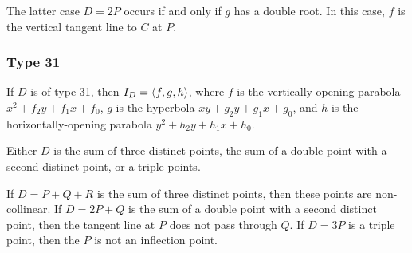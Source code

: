   The latter case $D = 2P$ occurs if and only if $g$ has a double root.
  In this case, $f$ is the vertical tangent line to $C$ at $P$.

\begin{comment}
\subsubsection{Type 21}
  If $D$ is of type 21, then $I_D = \pid{f, g}$, where $f$ is the non-vertical line $y + f_1x + f_0$
  and $g$ is the univariate polynomial $x^2 + g_1x + g_0$.
  Thus $D$ is the sum of two points on the line $f$, whose $x$-coordinates are the roots of $g$.
  
  There are two possibilities.
  If $g$ has two distinct roots, then $D = P + Q$ for two distinct points $P$ and $Q$.
  If $g$ has a double root, then $D = 2P$ and $f$ is the tangent line at $P$.
  
  So either $D$ is the sum of two distinct points with different $x$-coordinates,
  or $D$ is a double point $D = 2P$ and the tangent line at $P$ is non-vertical.
\end{comment}
\begin{comment}
\subsubsection{Type 22}
  If $D$ is of type 21, then $I_D = \pid{f, g}$, where $f$ is the vertical line $x + f_0$
  and $g$ is the univariate polynomial $y^2 + g_2y + g_0$.
  
  Either $D = P + Q$ is the sum of two distinct points with the same $x$-coordinate but different $y$-coordinates,
  or $D = 2P$ is a double point and the tangent line at $P$ is vertical.
\end{comment}

\subsubsection{Type 31}
  If $D$ is of type 31, then $I_D = \left\langle f, g, h \right\rangle$,
  where $f$ is the vertically-opening parabola $x^2 + f_2y + f_1x + f_0$,
  $g$ is the hyperbola $xy + g_2y + g_1x + g_0$,
  and $h$ is the horizontally-opening parabola $y^2 + h_2y + h_1x + h_0$.
  
  Either $D$ is the sum of three distinct points,
  the sum of a double point with a second distinct point,
  or a triple points.
  
  If $D = P + Q + R$ is the sum of three distinct points, then these points are non-collinear.
  If $D = 2P + Q$ is the sum of a double point with a second distinct point,
  then the tangent line at $P$ does not pass through $Q$.
  If $D = 3P$ is a triple point, then the $P$ is not an inflection point.

